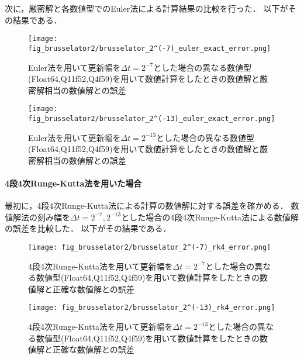 次に，厳密解と各数値型でのEuler法による計算結果の比較を行った．
以下がその結果である．\\
\begin{figure}[H]
    \centering
    \begin{minipage}[b]{0.49\columnwidth}
        \centering
        \texttt{[image: fig\_brusselator2/brusselator\_2^(-7)\_euler\_exact\_error.png]}
        \caption{Euler法を用いて更新幅を$\Delta t = 2^{-7}$とした場合の異なる数値型(Float64,Q11f52,Q4f59)を用いて数値計算をしたときの数値解と厳密解相当の数値解との誤差}
        \label{fig:brusselator_2^(-7)_euler_exact_error}
    \end{minipage}
    \begin{minipage}[b]{0.49\columnwidth}
        \centering
        \texttt{[image: fig\_brusselator2/brusselator\_2^(-13)\_euler\_exact\_error.png]}
        \caption{Euler法を用いて更新幅を$\Delta t =  2^{-13}$とした場合の異なる数値型(Float64,Q11f52,Q4f59)を用いて数値計算をしたときの数値解と厳密解相当の数値解との誤差}
        \label{fig:brusselator_2^(-13)_euler_exact_error}
    \end{minipage}
\end{figure}



\paragraph*{4段4次Runge-Kutta法を用いた場合}
最初に，4段4次Runge-Kutta法による計算の数値解に対する誤差を確かめる．
数値解法の刻み幅を$\Delta t = 2^{-7},2^{-13}$とした場合の4段4次Runge-Kutta法による数値解の誤差を比較した．
以下がその結果である．
\begin{figure}[H]
    \centering
    \begin{minipage}[b]{0.49\columnwidth}
        \centering
        \texttt{[image: fig\_brusselator2/brusselator\_2^(-7)\_rk4\_error.png]}
        \caption{4段4次Runge-Kutta法を用いて更新幅を$\Delta t = 2^{-7}$とした場合の異なる数値型(Float64,Q11f52,Q4f59)を用いて数値計算をしたときの数値解と正確な数値解との誤差}
        \label{fig:brusselator_2^(-7)_rk4_error}
    \end{minipage}
    \begin{minipage}[b]{0.49\columnwidth}
        \centering
        \texttt{[image: fig\_brusselator2/brusselator\_2^(-13)\_rk4\_error.png]}
        \caption{4段4次Runge-Kutta法を用いて更新幅を$\Delta t =  2^{-13}$とした場合の異なる数値型(Float64,Q11f52,Q4f59)を用いて数値計算をしたときの数値解と正確な数値解との誤差}
        \label{fig:brusselator_2^(-13)_rk4_error}
    \end{minipage}
\end{figure}


